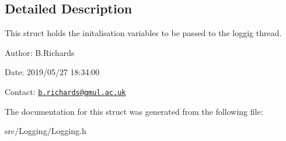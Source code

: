 \subsection{Detailed Description}
This struct holds the initalisation variables to be passed to the loggig thread.

\begin{DoxyParagraph}{Author\-:}
B.\-Richards 
\end{DoxyParagraph}
\begin{DoxyParagraph}{Date\-:}
2019/05/27 18\-:34\-:00 
\end{DoxyParagraph}
Contact\-: \href{mailto:b.richards@qmul.ac.uk}{\tt b.\-richards@qmul.\-ac.\-uk} 

The documentation for this struct was generated from the following file\-:\begin{DoxyCompactItemize}
\item 
src/\-Logging/Logging.\-h\end{DoxyCompactItemize}
